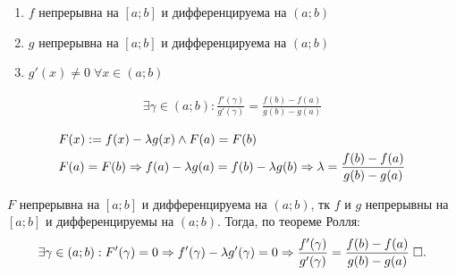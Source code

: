 \documentclass{article}
\begin{document}

\theorem[Коши]

\begin{enumerate}
	\item$f$ непрерывна на $[a;b]$ и дифференцируема на $(a;b)$
	\item$g$ непрерывна на $[a;b]$ и дифференцируема на $(a;b)$
	\item$g'(x)\neq0\;\forall x\in (a;b)$
\end{enumerate}
\begin{align*}
	\exists \gamma\in(a;b):\frac{f'(\gamma)}{g'(\gamma)}=\frac{f(b)-f(a)}{g(b)-g(a)}
\end{align*}

\proof
\begin{align*}
	 & F(x):=f(x)-\lambda g(x) \land F(a)=F(b)             \\
	 & F(a)=F(b) \Rightarrow f(a)-\lambda g(a)=f(b)-\lambda g(b)
	\Rightarrow\lambda=\frac{f(b)-f(a)}{g(b)-g(a)}
\end{align*}

$F$ непрерывна на $[a;b]$ и дифференцируема на $(a;b)$, тк $f$ и $g$ непрерывны на $[a;b]$ и дифференцируемы на $(a;b)$. Тогда, по теореме Ролля:
\begin{align*}
	\exists\gamma\in(a;b):F'(\gamma)=0 \Rightarrow f'(\gamma)-\lambda g'(\gamma)=0
	\Rightarrow \frac{f'(\gamma)}{g'(\gamma)}=\frac{f(b)-f(a)}{g(b)-g(a)}\;\square.
\end{align*}
\end{document}
